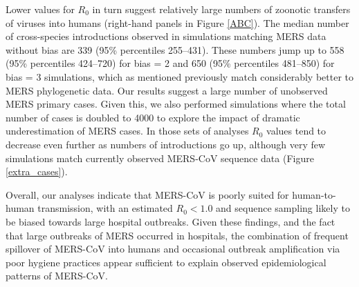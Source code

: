 \documentclass[11pt,oneside,letterpaper]{article}
\def\tbc#1{\textcolor{purple}{[#1]}}
\def\gdc#1{\textcolor{blue}{[#1]}}
\def\lmc#1{\textcolor{green}{[#1]}}
\begin{document}
Lower values for $R_{0}$ in turn suggest relatively large numbers of zoonotic transfers of viruses into humans (right-hand panels in Figure \ref{ABC}).
The median number of cross-species introductions observed in simulations matching MERS data without bias are 339 (95\% percentiles 255--431).
These numbers jump up to 558 (95\% percentiles 424--720) for bias = 2 and 650 (95\% percentiles 481--850) for bias = 3 simulations, which as mentioned previously match considerably better to MERS phylogenetic data.
Our results suggest a large number of unobserved MERS primary cases.%
Given this, we also performed simulations where the total number of cases is doubled to 4000 to explore the impact of dramatic underestimation of MERS cases.
In those sets of analyses $R_{0}$ values tend to decrease even further as numbers of introductions go up, although very few simulations match currently observed MERS-CoV sequence data (Figure \ref{extra_cases}).

Overall, our analyses indicate that MERS-CoV is poorly suited for human-to-human transmission, with an estimated $R_{0}<1.0$ and sequence sampling likely to be biased towards large hospital outbreaks.
Given these findings, and the fact that large outbreaks of MERS occurred in hospitals, the combination of frequent spillover of MERS-CoV into humans and occasional outbreak amplification via poor hygiene practices \citep{assiri_hospital_2013,chen_comparative_2017} appear sufficient to explain observed epidemiological patterns of MERS-CoV.
\end{document}
